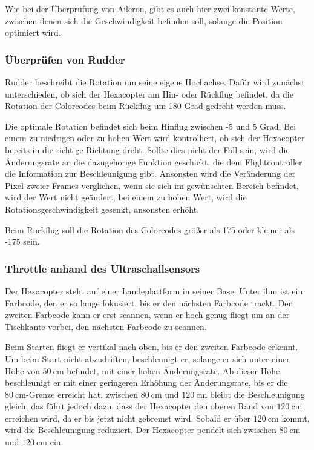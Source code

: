     Wie bei der Überprüfung von Aileron, gibt es auch hier zwei konstante Werte, zwischen denen sich die Geschwindigkeit befinden soll, solange die Position optimiert wird.

    \subsubsection{Überprüfen von Rudder}
    Rudder beschreibt die Rotation um seine eigene Hochachse. Dafür wird zunächst unterschieden, ob sich der Hexacopter am Hin- oder Rückflug befindet, da die Rotation der Colorcodes beim Rückflug um 180 Grad gedreht werden muss.

    Die optimale Rotation befindet sich beim Hinflug zwischen -5 und 5 Grad.
    Bei einem zu niedrigen oder zu hohen Wert wird kontrolliert, ob sich der Hexacopter bereits in die richtige Richtung dreht.
    Sollte dies nicht der Fall sein, wird die Änderungsrate an die dazugehörige Funktion geschickt, die dem Flightcontroller die Information zur Beschleunigung gibt.
    Ansonsten wird die Veränderung der Pixel zweier Frames verglichen, wenn sie sich im gewünschten Bereich befindet, wird der Wert nicht geändert, bei einem zu hohen Wert, wird die Rotationsgeschwindigkeit gesenkt, ansonsten erhöht.

    Beim Rückflug soll die Rotation des Colorcodes größer als 175 oder kleiner als -175 sein.

    \subsubsection{Throttle anhand des Ultraschallsensors}
    Der Hexacopter steht auf einer Landeplattform in seiner Base. Unter ihm ist ein Farbcode, den er so lange fokusiert, bis er den nächsten Farbcode trackt. Den zweiten Farbcode kann er erst scannen, wenn er hoch genug fliegt um an der Tischkante vorbei, den nächsten Farbcode zu scannen.

    Beim Starten fliegt er vertikal nach oben, bis er den zweiten Farbcode erkennt. Um beim Start nicht abzudriften, beschleunigt er, solange er sich unter einer Höhe von $\SI{50}{\centi\metre}$ befindet, mit einer hohen Änderungsrate. Ab dieser Höhe beschleunigt er mit einer geringeren Erhöhung der Änderungsrate, bis er die $\SI{80}{\centi\metre}$-Grenze erreicht hat.
    zwischen $\SI{80}{\centi\metre}$ und $\SI{120}{\centi\metre}$ bleibt die Beschleunigung gleich, das führt jedoch dazu, dass der Hexacopter den oberen Rand von $\SI{120}{\centi\metre}$ erreichen wird, da er bis jetzt nicht gebremst wird. Sobald er über $\SI{120}{\centi\metre}$ kommt, wird die Beschleunigung reduziert. Der Hexacopter pendelt sich zwischen $\SI{80}{\centi\metre}$ und $\SI{120}{\centi\metre}$ ein.

